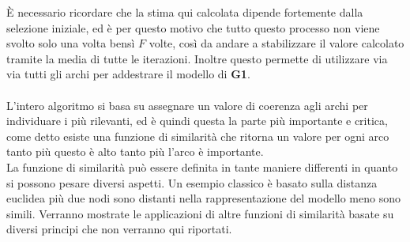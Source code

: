 È necessario ricordare che la stima qui calcolata dipende fortemente dalla selezione iniziale, ed è per questo motivo che tutto questo processo non viene svolto solo una volta bensì $F$ volte, così da andare a stabilizzare il valore calcolato tramite la media di tutte le iterazioni. Inoltre questo permette di utilizzare via via tutti gli archi per addestrare il modello di \textbf{G1}.\\
\\
L'intero algoritmo si basa su assegnare un valore di coerenza agli archi per individuare i più rilevanti, ed è quindi questa la parte più importante e critica, come detto esiste una funzione di similarità che ritorna un valore per ogni arco tanto più questo è alto tanto più l'arco è importante.\\
La funzione di similarità può essere definita in tante maniere differenti in quanto si possono pesare diversi aspetti. Un esempio classico è basato sulla distanza euclidea più due nodi sono distanti nella rappresentazione del modello meno sono simili. Verranno mostrate le applicazioni di altre funzioni di similarità basate su diversi principi che non verranno qui riportati.
%
